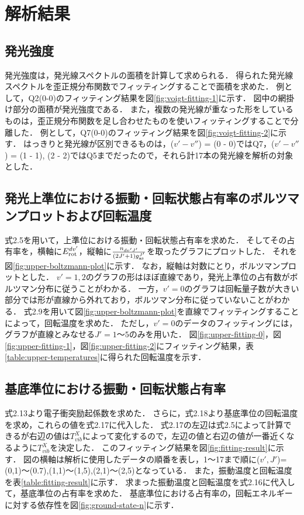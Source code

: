 \chapter{解析結果}

\section{発光強度}
発光強度は，発光線スペクトルの面積を計算して求められる．
得られた発光線スペクトルを歪正規分布関数でフィッティングすることで面積を求めた．
例として，Q2(0-0)のフィッティング結果を図\ref{fig:voigt-fitting-1}に示す．
図中の網掛け部分の面積が発光強度である．
また，複数の発光線が重なった形をしているものは，歪正規分布関数を足し合わせたものを使いフィッティングすることで分離した．
例として，Q7(0-0)のフィッティング結果を図\ref{fig:voigt-fitting-2}に示す．
はっきりと発光線が区別できるものは，($v'-v''$) = (0 - 0)ではQ7，($v'-v''$) = (1 - 1), (2 - 2)ではQ5までだったので，それら計17本の発光線を解析の対象とした．

\section{発光上準位における振動・回転状態占有率のボルツマンプロットおよび回転温度}
式2.5を用いて，上準位における振動・回転状態占有率を求めた．
そしてその占有率を，横軸に$E^{dv'}_{\rm rot}$，縦軸に$\frac{n_{dv'J'}}{\left( 2J'+1 \right) g^{J'}_{\rm as}}$を取ったグラフにプロットした．
それを図\ref{fig:upper-boltzmann-plot}に示す．
なお，縦軸は対数にとり，ボルツマンプロットとした．
$v'=1,2$のグラフの形はほぼ直線であり，発光上準位の占有数がボルツマン分布に従うことがわかる．
一方，$v'=0$のグラフは回転量子数が大きい部分では形が直線から外れており，ボルツマン分布に従っていないことがわかる．
式2.9を用いて図\ref{fig:upper-boltzmann-plot}を直線でフィッティングすることによって，回転温度を求めた．
ただし，$v'=0$のデータのフィッティングには，グラフが直線とみなせる$J'=1〜5$のみを用いた．
図\ref{fig:upper-fitting-0}，図\ref{fig:upper-fitting-1}，図\ref{fig:upper-fitting-2}にフィッティング結果，表\ref{table:upper-temperatures}に得られた回転温度を示す．

\section{基底準位における振動・回転状態占有率}
式2.13より電子衝突励起係数を求めた．
さらに，式2.18より基底準位の回転温度を求め，これらの値を式2.17に代入した．
式2.17の左辺は式2.5によって計算できるが右辺の値は$T^X_{vib}$によって変化するので，左辺の値と右辺の値が一番近くなるように$T^X_{vib}$を決定した．
このフィッティング結果を図\ref{fig:fitting-result}に示す．
図の横軸は解析に使用したデータの順番を表し，1〜17まで順に($v',J'$)=(0,1)〜(0.7),(1,1)〜(1,5),(2,1)〜(2,5)となっている．
また，振動温度と回転温度を表\ref{table:fitting-result}に示す．
求まった振動温度と回転温度を式2.16に代入して，基底準位の占有率を求めた．
基底準位における占有率の，回転エネルギーに対する依存性を図\ref{fig:ground-state-n}に示す．